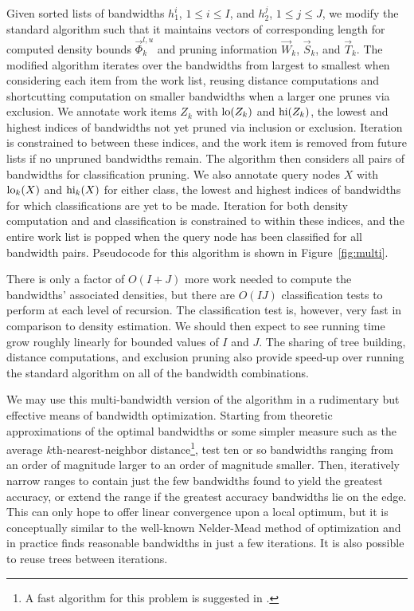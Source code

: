 \documentclass[twoside,leqno,twocolumn]{article}
\newcommand{\lohi}[1]{#1^{l,u}}
\begin{document}
Given sorted lists of bandwidths $h_1^i$, $1 \leq i \leq I$, and
$h_2^j$, $1 \leq j \leq J$, we modify the standard algorithm such that
it maintains vectors of corresponding length for computed density
bounds $\lohi{\vec{\Phi}_k}$ and pruning information $\vec{W}_k$,
$\vec{S}_k$, and $\vec{T}_k$.  The modified algorithm iterates over
the bandwidths from largest to smallest when considering each item
from the work list, reusing distance computations and shortcutting
computation on smaller bandwidths when a larger one prunes via
exclusion.  We annotate work items $Z_k$ with ${\rm lo}(Z_k)$ and
${\rm hi}(Z_k)$, the lowest and highest indices of bandwidths not yet
pruned via inclusion or exclusion.  Iteration is constrained to
between these indices, and the work item is removed from future lists
if no unpruned bandwidths remain.  The algorithm then considers all
pairs of bandwidths for classification pruning. We also annotate query
nodes $X$ with ${\rm lo}_k(X)$ and ${\rm hi}_k(X)$ for either class,
the lowest and highest indices of bandwidths for which classifications
are yet to be made.  Iteration for both density computation and and
classification is constrained to within these indices, and the entire
work list is popped when the query node has been classified for all
bandwidth pairs.  Pseudocode for this algorithm is shown in
Figure~\ref{fig:multi}.

There is only a factor of $O(I + J)$ more work needed to compute the
bandwidths' associated densities, but there are $O(IJ)$ classification
tests to perform at each level of recursion.  The classification test
is, however, very fast in comparison to density estimation.  We should
then expect to see running time grow roughly linearly for bounded
values of $I$ and $J$.  The sharing of tree building, distance
computations, and exclusion pruning also provide speed-up over running
the standard algorithm on all of the bandwidth combinations.

We may use this multi-bandwidth version of the algorithm in a
rudimentary but effective means of bandwidth optimization.  Starting
from theoretic approximations of the optimal bandwidths
\cite{silverman86} or some simpler measure such as the average
$k$th-nearest-neighbor distance\footnote{A fast algorithm for this
problem is suggested in \cite{nips2000paper}.}, test ten or so
bandwidths ranging from an order of magnitude larger to an order of
magnitude smaller.  Then, iteratively narrow ranges to contain just
the few bandwidths found to yield the greatest accuracy, or extend the
range if the greatest accuracy bandwidths lie on the edge.  This can
only hope to offer linear convergence upon a local optimum, but it is
conceptually similar to the well-known Nelder-Mead method of
optimization and in practice finds reasonable bandwidths in just a few
iterations.  It is also possible to reuse trees between iterations.
\end{document}

